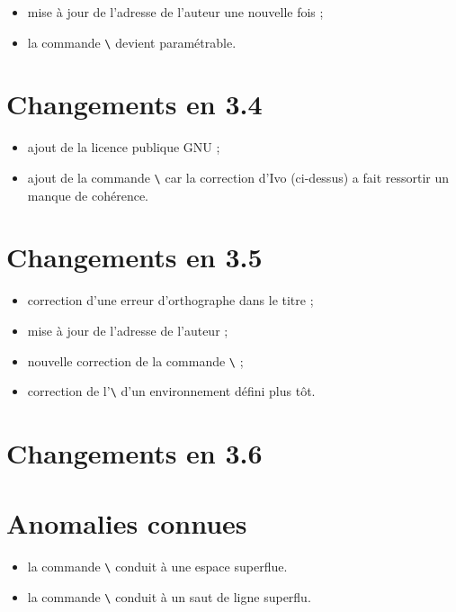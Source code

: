 \documentclass[parskip=false, DIV=8, headings=normal, pagesize=auto]{scrartcl}
\makeatletter
\newcommand*{\cs}[1]{\texttt{\textbackslash#1}}
\newcommand*{\cmd}[1]{\cs{\expandafter\@gobble\string#1}}
\makeatother
\begin{document}
\begin{itemize}
\item mise à jour de l'adresse de l'auteur une nouvelle fois ;
\item la commande \cmd{\CommentCutFile} devient paramétrable.
\end{itemize}


\section{Changements en 3.4}

\begin{itemize}
\item ajout de la licence publique GNU ;
\item ajout de la commande \cmd{\processcomment} car la correction d'Ivo 
(ci-dessus) a fait ressortir un manque de cohérence.
\end{itemize}

  
\section{Changements en 3.5}

\begin{itemize}
\item correction d'une erreur d'orthographe dans le titre ;
\item mise à jour de l'adresse de l'auteur ;
\item nouvelle correction de la commande \cmd{\specialcomment} ;
\item correction de l'\cmd{\excludecomment} d'un environnement défini plus tôt.
\end{itemize}

\section{Changements en 3.6}



\section{Anomalies connues}

\begin{itemize}
\item la commande \cmd{\excludecomment} conduit à une espace superflue.
\item la commande \cmd{\processcomment} conduit à un saut de ligne superflu.
\end{itemize}
\end{document}
